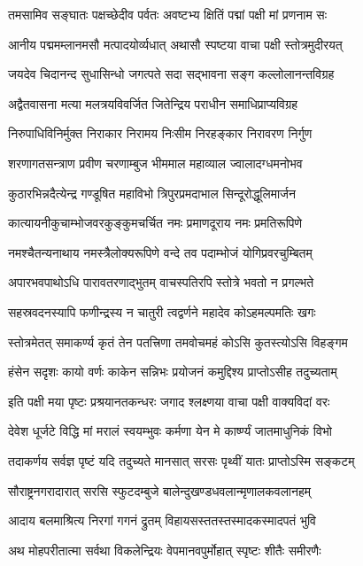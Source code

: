 \twolineshloka
{तमसामिव सङ्घातः पक्षच्छेदीव पर्वतः}
{अवष्टभ्य क्षितिं पद्मां पक्षी मां प्रणनाम सः} %

\twolineshloka
{आनीय पद्ममम्लानमसौ मत्पादयोर्व्यधात्}
{अथासौ स्पष्टया वाचा पक्षी स्तोत्रमुदीरयत्} %

\twolineshloka
{जयदेव चिदानन्द सुधासिन्धो जगत्पते}
{सदा सद्भावना सङ्ग कल्लोलानन्तविग्रह} %

\twolineshloka
{अद्वैतवासना मत्या मलत्रयविवर्जित}
{जितेन्द्रिय पराधीन समाधिप्राप्यविग्रह} %

\twolineshloka
{निरुपाधिविनिर्मुक्त निराकार निरामय}
{निःसीम निरहङ्कार निरावरण निर्गुण} %

\twolineshloka
{शरणागतसन्त्राण प्रवीण चरणाम्बुज}
{भीममाल महाव्याल ज्वालादग्धमनोभव} %

\twolineshloka
{कुठारभिन्नदैत्येन्द्र गण्डूषित महाविभो}
{त्रिपुरप्रमदाभाल सिन्दूरोद्धूलिमार्जन} %

\twolineshloka
{कात्यायनीकुचाम्भोजवरकुङ्कुमचर्चित}
{नमः प्रमाणदूराय नमः प्रमतिरूपिणे} %

\twolineshloka
{नमश्चैतन्यनाथाय नमस्त्रैलोक्यरूपिणे}
{वन्दे तव पदाम्भोजं योगिप्रवरचुम्बितम्} %

\twolineshloka
{अपारभवपाथोऽधि पारावतरणाद्भुतम्}
{वाचस्पतिरपि स्तोत्रे भवतो न प्रगल्भते} %

\twolineshloka
{सहस्रवदनस्यापि फणीन्द्रस्य न चातुरी}
{त्वद्वर्णने महादेव कोऽहमल्पमतिः खगः} %

\twolineshloka
{स्तोत्रमेतत् समाकर्ण्य कृतं तेन पतत्त्रिणा}
{तमवोचमहं कोऽसि कुतस्त्योऽसि विहङ्गम} %

\twolineshloka
{हंसेन सदृशः कायो वर्णः काकेन सन्निभः}
{प्रयोजनं कमुद्दिश्य प्राप्तोऽसीह तदुच्यताम्} %

\twolineshloka
{इति पक्षी मया पृष्टः प्रश्रयानतकन्धरः}
{जगाद श्लक्ष्णया वाचा पक्षी वाक्यविदां वरः} %

\twolineshloka
{देवेश धूर्जटे विद्धि मां मरालं स्वयम्भुवः}
{कर्मणा येन मे कार्ष्ण्यं जातमाधुनिकं विभो} %

\twolineshloka
{तदाकर्णय सर्वज्ञ पृष्टं यदि तदुच्यते}
{मानसात् सरसः पृथ्वीं यातः प्राप्तोऽस्मि सङ्कटम्} %

\twolineshloka
{सौराष्ट्रनगरादारात् सरसि स्फुटदम्बुजे}
{बालेन्दुखण्डधवलान्मृणालकवलानहम्} %

\twolineshloka
{आदाय बलमाश्रित्य निरगां गगनं द्रुतम्}
{विहायसस्ततस्तस्मादकस्मादपतं भुवि} %

\twolineshloka
{अथ मोहपरीतात्मा सर्वथा विकलेन्द्रियः}
{वेपमानवपुर्मोहात् स्पृष्टः शीतैः समीरणैः} %

